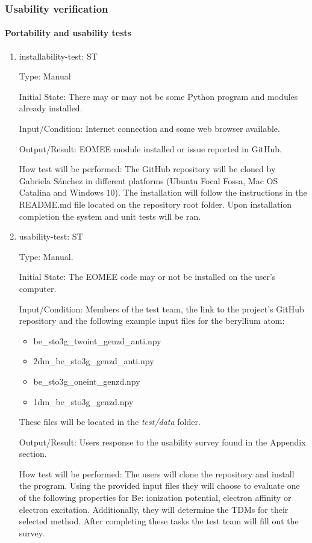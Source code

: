 \documentclass[12pt, titlepage]{article}
\newcounter{systnum} %
\begin{document}
\subsubsection{Usability verification}
\label{section:usability}

\paragraph{Portability and usability tests}

\begin{enumerate}
	
	\item{installability-test: ST\thesystnum 
	\label{ST5}}
	
	Type: Manual
	
	Initial State: There may or may not be some Python program and modules 
	already installed.
	
	Input/Condition: Internet connection and some web browser available.
	
	Output/Result: EOMEE module installed or issue reported in GitHub.
	
	How test will be performed: 
	The GitHub repository will be cloned by Gabriela S\'anchez in different 
	platforms (Ubuntu Focal 
	Fossa, Mac OS Catalina and Windows 10). The installation will follow the 
	instructions in the README.md file located on the repository root folder. 
	Upon installation completion the system and unit tests will be ran. 

	\item{usability-test: ST\thesystnum \label{ST6}\\}
	\label{sec:usability}
	
	Type: Manual.
	
	Initial State: The EOMEE code may or not be installed on the user's 
	computer.
	
	Input/Condition: Members of the test team, the link to the project's GitHub 
	repository and the following example input files for the beryllium atom:
	\begin{itemize}
		\item be\_sto3g\_twoint\_genzd\_anti.npy
		\item 2dm\_be\_sto3g\_genzd\_anti.npy
		\item be\_sto3g\_oneint\_genzd.npy
		\item 1dm\_be\_sto3g\_genzd.npy
	\end{itemize}
	These files will be located in the \textit{test/data} folder.
	
	Output/Result: Users response to the usability survey found in the Appendix 
	section.
	
	How test will be performed: The users will clone the repository and install 
	the program. Using the provided input files they will choose to evaluate 
	one of the following properties for Be: ionization potential, electron 
	affinity or electron excitation. Additionally, they will determine the TDMs 
	for their selected method. After completing these tasks the test team will 
	fill out the survey.
	
	
\end{enumerate}
\end{document}
